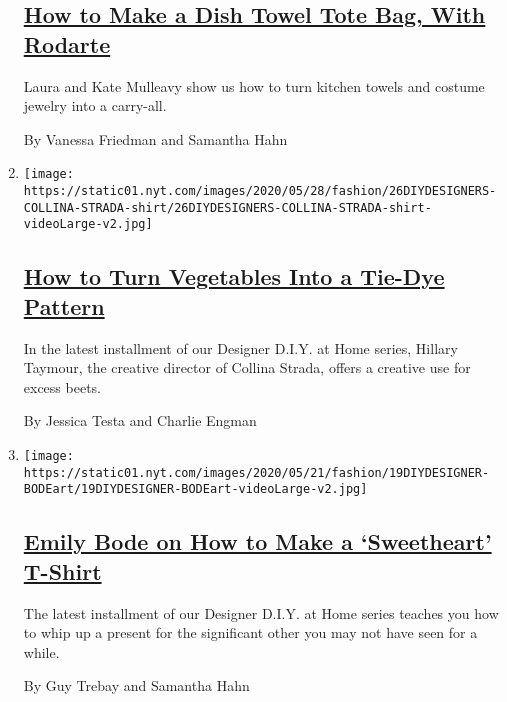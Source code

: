 \begin{enumerate}
{  \subsection{\texorpdfstring{\href{/2020/06/02/style/dish-towel-tote-bag.html}{How
  to Make a Dish Towel Tote Bag, With
  Rodarte}}{How to Make a Dish Towel Tote Bag, With Rodarte}}\label{how-to-make-a-dish-towel-tote-bag-with-rodarte}}

  Laura and Kate Mulleavy show us how to turn kitchen towels and costume
  jewelry into a carry-all.

  By Vanessa Friedman and Samantha Hahn
\item
  \texttt{[image: https://static01.nyt.com/images/2020/05/28/fashion/26DIYDESIGNERS-COLLINA-STRADA-shirt/26DIYDESIGNERS-COLLINA-STRADA-shirt-videoLarge-v2.jpg]}

  \hypertarget{how-to-turn-vegetables-into-a-tie-dye-pattern}{%
  \subsection{\texorpdfstring{\href{/2020/05/27/style/tie-dye-plaid-with-collina-strada.html}{How
  to Turn Vegetables Into a Tie-Dye
  Pattern}}{How to Turn Vegetables Into a Tie-Dye Pattern}}\label{how-to-turn-vegetables-into-a-tie-dye-pattern}}

  In the latest installment of our Designer D.I.Y. at Home series,
  Hillary Taymour, the creative director of Collina Strada, offers a
  creative use for excess beets.

  By Jessica Testa and Charlie Engman
\item
  \texttt{[image: https://static01.nyt.com/images/2020/05/21/fashion/19DIYDESIGNER-BODEart/19DIYDESIGNER-BODEart-videoLarge-v2.jpg]}

  \hypertarget{emily-bode-on-how-to-make-a-sweetheart-t-shirt}{%
  \subsection{\texorpdfstring{\href{/2020/05/19/style/emily-bode-sweetheart-t-shirt.html}{Emily
  Bode on How to Make a `Sweetheart'
  T-Shirt}}{Emily Bode on How to Make a `Sweetheart' T-Shirt}}\label{emily-bode-on-how-to-make-a-sweetheart-t-shirt}}

  The latest installment of our Designer D.I.Y. at Home series teaches
  you how to whip up a present for the significant other you may not
  have seen for a while.

  By Guy Trebay and Samantha Hahn
\end{enumerate}

